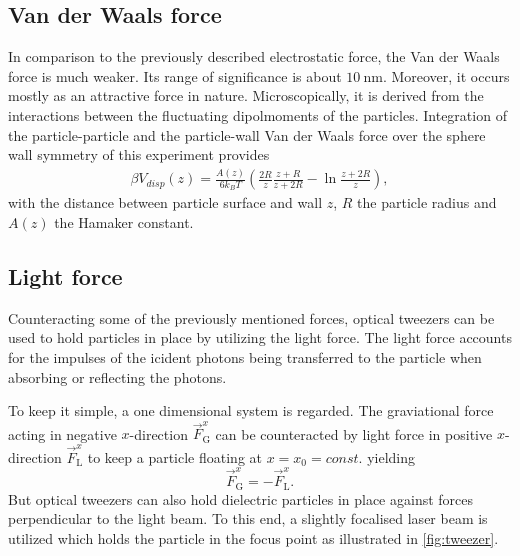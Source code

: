 \documentclass[.../bericht]{subfilies}
\begin{document}
    \subsection{Van der Waals force}
    \label{subsec:vanderwaals}

    In comparison to the previously described electrostatic force, the Van der Waals force is much weaker. Its range of significance is about $\SI{10}{\nano\meter}$. Moreover, it occurs mostly as an attractive force in nature. Microscopically, it is derived from the interactions between the fluctuating dipolmoments of the particles. Integration of the particle-particle and the particle-wall Van der Waals force over the sphere wall symmetry of this experiment provides
    \begin{align}
    \beta V_{disp}(z)=\frac{A(z)}{6k_B T}\left(\frac{2R}{z}\frac{z+R}{z+2R}-\ln\frac{z+2R}{z}\right),
    \end{align}
    with the distance between particle surface and wall $z$, $R$ the particle radius and $A(z)$ the Hamaker constant.


    \subsection{Light force}

    Counteracting some of the previously mentioned forces, optical tweezers can be used to hold particles in place by utilizing the light force. The light force accounts for the impulses of the icident photons being transferred to the particle when absorbing or reflecting the photons.

    To keep it simple, a one dimensional system is regarded. The graviational force acting in negative $x$-direction $\vec{F}_\mathrm{G}^x$ can be counteracted by light force in positive $x$-direction $\vec{F}_\mathrm{L}^x$ to keep a particle floating at $x=x_0=const.$ yielding
    \begin{equation*}
    \vec{F}_\mathrm{G}^x=-\vec{F}_\mathrm{L}^x.
    \end{equation*}
    But optical tweezers can also hold dielectric particles in place against forces perpendicular to the light beam. To this end, a slightly focalised laser beam is utilized which holds the particle in the focus point as illustrated in \ref{fig:tweezer}.
\end{document}
